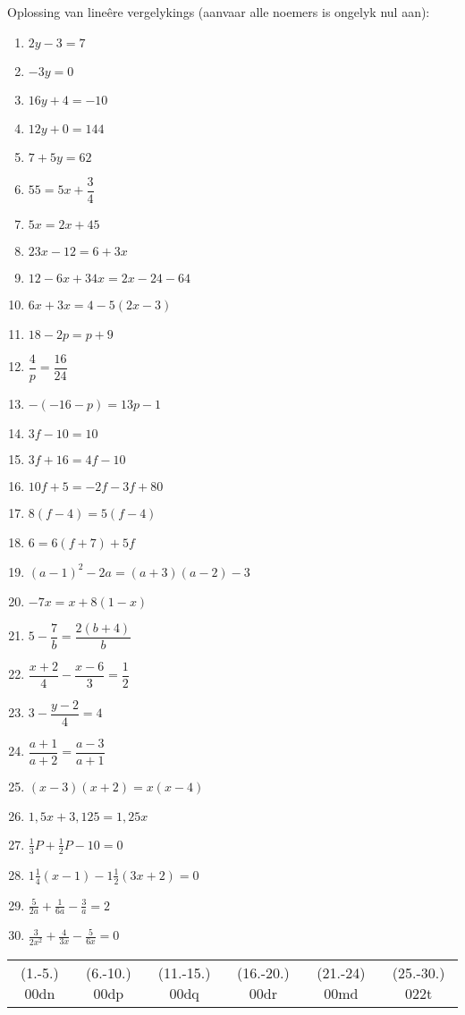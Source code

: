 \begin{exercises}{}
{Oplossing van lineêre vergelykings (aanvaar alle noemers is ongelyk nul aan):

\begin{multicols}{2}
\begin{enumerate}[itemsep=6pt, label=\textbf{\arabic*}. ] 
\item   $2y-3=7$
\item   $-3y=0$        
\item   $16y+4=-10$        
\item   $12y+0=144$
\item   $7+5y=62$       
\item   $55=5x+\dfrac{3}{4}$ 
\item   $5x=2x+45$        
\item   $23x-12=6+3x$
\item   $12-6x+34x=2x-24-64$
\item   $6x+3x=4-5(2x-3)$
\item   $18-2p=p+9$   
\item   $\dfrac{4}{p}=\dfrac{16}{24}$
\item   $-(-16-p)=13p-1$
\item   $3f-10=10$
\item   $3f+16=4f-10$
\item   $10f+5=-2f-3f+80$
\item   $8(f-4)=5(f-4)$
\item  $6=6(f+7)+5f$      
\item $(a-1)^{2} - 2a = (a+3)(a-2) - 3$
\item $-7x = x+8(1-x)$ 
\item $5-\dfrac{7}{b} = \dfrac{2(b+4)}{b}$
\item $\dfrac{x+2}{4} - \dfrac{x-6}{3} = \dfrac{1}{2}$
\item $ 3 - \dfrac{y-2}{4} = 4$
\item $ \dfrac{a+1}{a+2} = \dfrac{a-3}{a+1}$
\item $(x-3)(x+2)=x(x-4)$
\item $1,5x+3,125=1,25x$
\item $\frac{1}{3}P + \frac{1}{2}P - 10 = 0$
\item $1 \frac{1}{4} (x-1)-1\frac{1}{2}(3x+2)=0$
\item $\frac{5}{2a}+\frac{1}{6a}-\frac{3}{a}=2$
\item $\frac{3}{2x^2}+\frac{4}{3x}-\frac{5}{6x}=0$  
\end{enumerate}
\end{multicols}
\practiceinfo
\par 
\par \begin{tabular}[h]{cccccc}
(1.-5.) 00dn&  (6.-10.) 00dp&  (11.-15.) 00dq&  (16.-20.) 00dr& (21.-24) 00md & (25.-30.) 022t & \end{tabular}
}
\end{exercises}


